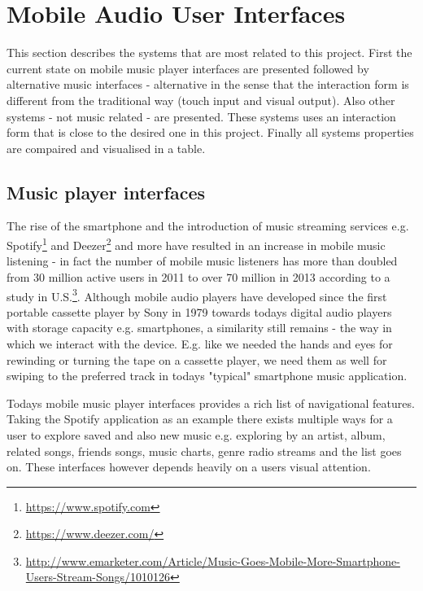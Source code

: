 \section{Mobile Audio User Interfaces}
\label{sec:mobileaudiointerfaces}
This section describes the systems that are most related to this project. First the current state on mobile music player interfaces are presented followed by alternative music interfaces - alternative in the sense that the interaction form is different from the traditional way (touch input and visual output). Also other systems - not music related - are presented. These systems uses an interaction form that is close to the desired one in this project. Finally all systems properties are compaired and visualised in a table.

\subsection{Music player interfaces}
\label{sec:alternativemusicuis}
The rise of the smartphone and the introduction of music streaming services e.g. Spotify\footnote{\url{https://www.spotify.com}} and Deezer\footnote{\url{https://www.deezer.com/}} and more have resulted in an increase in mobile music listening - in fact the number of mobile music listeners has more than doubled from 30 million active users in 2011 to over 70 million in 2013 according to a study in U.S.\footnote{\url{http://www.emarketer.com/Article/Music-Goes-Mobile-More-Smartphone-Users-Stream-Songs/1010126}}. Although mobile audio players have developed since the first portable cassette player by Sony in 1979 towards todays digital audio players with storage capacity e.g. smartphones, a similarity still remains - the way in which we interact with the device. E.g. like we needed the hands and eyes for rewinding or turning the tape on a cassette player, we need them as well for swiping to the preferred track in todays "typical" smartphone music application.

Todays mobile music player interfaces provides a rich list of navigational features. Taking the Spotify application as an example there exists multiple ways for a user to explore saved and also new music e.g. exploring by an artist, album, related songs, friends songs, music charts, genre radio streams and the list goes on. These interfaces however depends heavily on a users visual attention.

